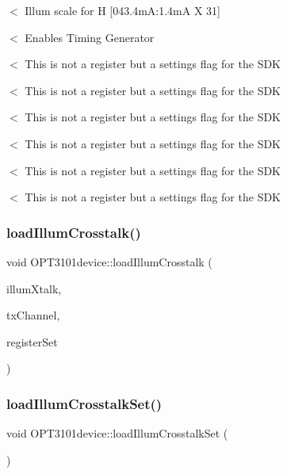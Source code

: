 $<$ Illum scale for H \mbox{[}043.\+4mA\+:1.\+4mA X 31\mbox{]}

$<$ Enables Timing Generator

$<$ This is not a register but a settings flag for the S\+DK

$<$ This is not a register but a settings flag for the S\+DK

$<$ This is not a register but a settings flag for the S\+DK

$<$ This is not a register but a settings flag for the S\+DK

$<$ This is not a register but a settings flag for the S\+DK

$<$ This is not a register but a settings flag for the S\+DK \mbox{\label{class_o_p_t3101device_aea3e493b07770dcff587bc38c4049611}} 
\subsubsection{\texorpdfstring{load\+Illum\+Crosstalk()}{loadIllumCrosstalk()}}
{\footnotesize\ttfamily void O\+P\+T3101device\+::load\+Illum\+Crosstalk (\begin{DoxyParamCaption}\item[{\mbox{\hyperlink{class_o_p_t3101_1_1crosstalk_c}{O\+P\+T3101\+::crosstalkC}} $\ast$}]{illum\+Xtalk,  }\item[{uint8\+\_\+t}]{tx\+Channel,  }\item[{char}]{register\+Set }\end{DoxyParamCaption})}

\mbox{\label{class_o_p_t3101device_af18fa1d1db587c0e220d0bbc955662a9}} 
\subsubsection{\texorpdfstring{load\+Illum\+Crosstalk\+Set()}{loadIllumCrosstalkSet()}}
{\footnotesize\ttfamily void O\+P\+T3101device\+::load\+Illum\+Crosstalk\+Set (\begin{DoxyParamCaption}\item[{void}]{ }\end{DoxyParamCaption})}

